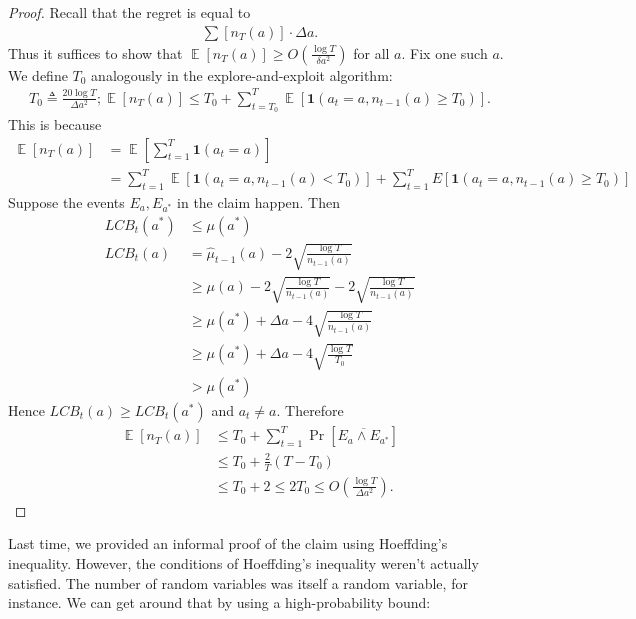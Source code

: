 \documentclass[11pt]{article}
\newcommand{\E}{\mathop{\mathbb{E}}}
\newcommand{\te}{\triangleq}
\begin{document}
\begin{proof}
  Recall that the regret is equal to 
  \begin{align*}
    \sum[n_T(a)] \cdot \Delta a.
  \end{align*}
  Thus it suffices to show that $\E\left[ n_T(a) \right] \geq O(\frac{\log T}{\delta a^2})$ for all $a$.
  Fix one such $a$.
  We define $T_0$ analogously in the explore-and-exploit algorithm:
  \begin{align*}
    T_0 \te \frac{20 \log T}{\Delta a^2}; \E\left[ n_T(a) \right] \leq T_0 + \sum_{t = T_0}^T \E\left[ \mathbf{1}(a_t = a, n_{t - 1}(a) \geq T_0) \right].
  \end{align*}
  This is because
  \begin{align*}
    \E\left[ n_T(a) \right] &=  \E\left[ \sum_{t = 1}^T \mathbf{1}(a_t = a) \right] \\
    &= \sum_{t = 1}^T \E\left[ \mathbf{1}(a_t = a, n_{t - 1}(a) < T_0) \right] + \sum_{t = 1}^T E\left[ \mathbf{1}(a_t = a, n_{t - 1}(a) \geq T_0) \right]
  \end{align*}
  Suppose the events $E_a, E_{a^*}$ in the claim happen.
  Then 
  \begin{align*}
    LCB_t(a^*) &\leq \mu(a^*) \\
    LCB_t(a) &= \hat \mu_{t - 1}(a) - 2\sqrt{\frac{\log T}{n_{t - 1}(a)}}\\
    &\geq \mu(a) - 2\sqrt{\frac{\log T}{n_{t - 1}(a)}} - 2\sqrt{\frac{\log T}{n_{t - 1}(a)}}\\
    &\geq \mu(a^*) + \Delta a - 4\sqrt{\frac{\log T}{n_{t - 1}(a)}}\\
    &\geq \mu(a^*) + \Delta a - 4 \sqrt{\frac{\log T}{T_0}}\\
    &> \mu(a^*)
  \end{align*}
  Hence $LCB_t(a) \geq LCB_t(a^*)$ and $a_t \neq a$.
  Therefore
  \begin{align*}
    \E\left[ n_T(a) \right] 
    &\leq T_0 + \sum_{t = 1}^T \Pr\left[ \overline {E_a \wedge E_{a^*}} \right]\\
    &\leq T_0 + \frac{2}{T} (T - T_0)\\
    &\leq T_0 + 2 \leq 2T_0 \leq O\left( \frac{\log T}{\Delta a^2} \right).
  \end{align*}
  

\end{proof}
Last time, we provided an informal proof of the claim using Hoeffding's inequality.
However, the conditions of Hoeffding's inequality weren't actually satisfied.
The number of random variables was itself a random variable, for instance.
We can get around that by using a high-probability bound:
\end{document}
